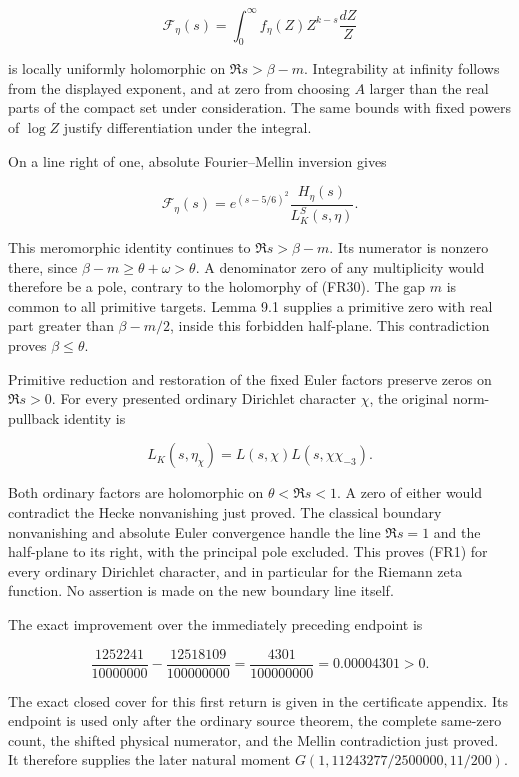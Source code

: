 \[
\mathcal F_\eta(s)=\int_0^\infty f_\eta(Z)Z^{k-s}\frac{dZ}{Z}
\tag{FR30}
\]

is locally uniformly holomorphic on \(\Re s>\beta-m\). Integrability at infinity follows from the displayed exponent, and at zero from choosing \(A\) larger than the real parts of the compact set under consideration. The same bounds with fixed powers of \(\log Z\) justify differentiation under the integral.

On a line right of one, absolute Fourier--Mellin inversion gives

\[
\mathcal F_\eta(s)=e^{(s-5/6)^2}
 \frac{H_\eta(s)}{L_K^S(s,\eta)}.
\tag{FR31}
\]

This meromorphic identity continues to \(\Re s>\beta-m\). Its numerator is nonzero there, since \(\beta-m\ge\theta+\omega>\theta\). A denominator zero of any multiplicity would therefore be a pole, contrary to the holomorphy of (FR30). The gap \(m\) is common to all primitive targets. Lemma 9.1 supplies a primitive zero with real part greater than \(\beta-m/2\), inside this forbidden half-plane. This contradiction proves \(\beta\le\theta\).

Primitive reduction and restoration of the fixed Euler factors preserve zeros on \(\Re s>0\). For every presented ordinary Dirichlet character \(\chi\), the original norm-pullback identity is

\[
L_K(s,\eta_\chi)=L(s,\chi)L(s,\chi\chi_{-3}).
\tag{FR32}
\]

Both ordinary factors are holomorphic on \(\theta<\Re s<1\). A zero of either would contradict the Hecke nonvanishing just proved. The classical boundary nonvanishing and absolute Euler convergence handle the line \(\Re s=1\) and the half-plane to its right, with the principal pole excluded. This proves (FR1) for every ordinary Dirichlet character, and in particular for the Riemann zeta function. No assertion is made on the new boundary line itself.

The exact improvement over the immediately preceding endpoint is

\[
\frac{1252241}{10000000}-\frac{12518109}{100000000}
=\frac{4301}{100000000}=0.00004301>0.
\tag{FR33}
\]

The exact closed cover for this first return is given in the certificate appendix. Its endpoint is used only after the ordinary source theorem, the complete same-zero count, the shifted physical numerator, and the Mellin contradiction just proved. It therefore supplies the later natural moment \(G(1,11243277/2500000,11/200)\).
